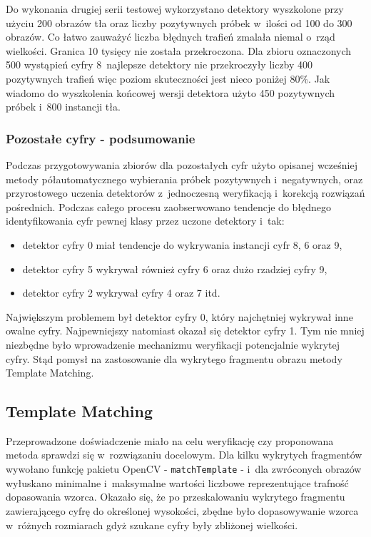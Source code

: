 Do wykonania drugiej serii testowej wykorzystano detektory
wyszkolone przy użyciu 200 obrazów tła oraz liczby pozytywnych 
próbek w~ilości od 100 do 300 obrazów. Co łatwo zauważyć liczba 
błędnych trafień zmalała niemal o~rząd wielkości. Granica 10 tysięcy
nie została przekroczona. Dla zbioru oznaczonych 500 wystąpień cyfry 
8~najlepsze detektory nie przekroczyły liczby 400 pozytywnych trafień
więc poziom skuteczności jest nieco poniżej 80\%. Jak wiadomo
do wyszkolenia końcowej wersji detektora użyto 450 pozytywnych próbek
i~800 instancji tła.

\subsubsection{Pozostałe cyfry - podsumowanie}

Podczas przygotowywania zbiorów dla pozostałych cyfr użyto 
opisanej wcześniej metody półautomatycznego wybierania próbek pozytywnych
i~negatywnych, oraz przyrostowego uczenia detektorów z~jednoczesną
weryfikacją i~korekcją rozwiązań pośrednich. Podczas całego
procesu zaobserwowano tendencje do błędnego identyfikowania cyfr pewnej
klasy przez uczone detektory i~tak:

\begin{itemize}
    \item detektor cyfry 0 miał tendencje do wykrywania instancji cyfr
        8, 6 oraz 9,
    \item detektor cyfry 5 wykrywał również cyfry 6 oraz dużo rzadziej
        cyfry 9,
    \item detektor cyfry 2 wykrywał cyfry 4 oraz 7 itd.
\end{itemize}

Największym problemem był detektor cyfry 0, który najchętniej
wykrywał inne owalne cyfry. Najpewniejszy natomiast okazał się
detektor cyfry 1. Tym nie mniej niezbędne było wprowadzenie
mechanizmu weryfikacji potencjalnie wykrytej cyfry. Stąd 
pomysł na zastosowanie dla wykrytego fragmentu obrazu metody
Template Matching.

\subsection{Template Matching}

Przeprowadzone doświadczenie miało na celu weryfikację czy
proponowana metoda sprawdzi się w~rozwiązaniu docelowym. Dla
kilku wykrytych fragmentów wywołano funkcję pakietu OpenCV 
- \verb|matchTemplate| - i~dla zwróconych obrazów wyłuskano
minimalne i~maksymalne wartości liczbowe reprezentujące trafność
dopasowania wzorca. Okazało się, że po przeskalowaniu wykrytego
fragmentu zawierającego cyfrę do określonej wysokości, zbędne
było dopasowywanie wzorca w~różnych rozmiarach gdyż szukane cyfry
były zbliżonej wielkości. 

